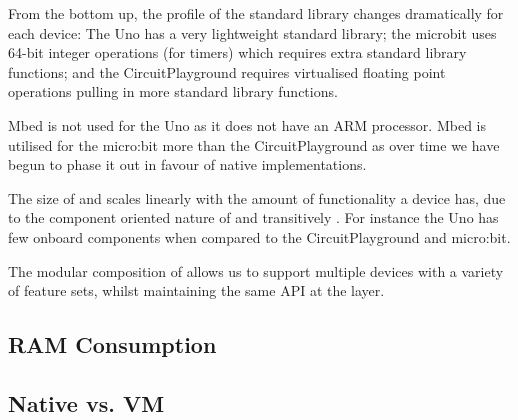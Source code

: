 From the bottom up, the profile of the standard library changes dramatically for each device: The Uno has a very lightweight standard library; the microbit uses 64-bit integer operations (for timers) which requires extra standard library functions; and the CircuitPlayground requires virtualised floating point operations pulling in more standard library functions.

Mbed is not used for the Uno as it does not have an ARM processor. Mbed is utilised for the micro:bit more than the CircuitPlayground as over time we have begun to phase it out in favour of native implementations.

The size of \CO and \MC scales linearly with the amount of functionality a device has, due to the component oriented nature of \CO and transitively \MC. For instance the Uno has few onboard components when compared to the CircuitPlayground and micro:bit.

The modular composition of \CO allows us to support multiple devices with a variety of feature sets, whilst maintaining the same API at the \MC layer.

\subsection{RAM Consumption}





\subsection{\MC Native vs. \MC VM}

